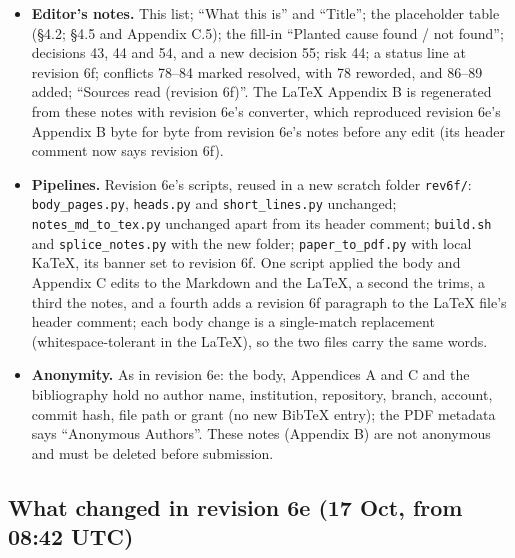 \documentclass{article}
\theoremstyle{plain}
\theoremstyle{definition}
\theoremstyle{remark}
\begin{document}
\begin{itemize}
        References); the heading sits about three lines lower on page 8 than in
        revision 6e.
  \item \textbf{Editor's notes.} This list; ``What this is'' and ``Title''; the
        placeholder table (\S{}4.2; \S{}4.5 and Appendix C.5); the fill-in
        ``Planted cause found / not found''; decisions 43, 44 and 54, and a new
        decision 55; risk 44; a status line at revision 6f; conflicts 78--84
        marked resolved, with 78 reworded, and 86--89 added; ``Sources read
        (revision 6f)''. The LaTeX Appendix B is regenerated from these notes
        with revision 6e's converter, which reproduced revision 6e's Appendix B
        byte for byte from revision 6e's notes before any edit (its header
        comment now says revision 6f).
  \item \textbf{Pipelines.} Revision 6e's scripts, reused in a new scratch
        folder \nolinkurl{rev6f/}: \nolinkurl{body_pages.py},
        \nolinkurl{heads.py} and \nolinkurl{short_lines.py} unchanged;
        \nolinkurl{notes_md_to_tex.py} unchanged apart from its header comment;
        \nolinkurl{build.sh} and \nolinkurl{splice_notes.py} with the new
        folder; \nolinkurl{paper_to_pdf.py} with local KaTeX, its banner set to
        revision 6f. One script applied the body and Appendix C edits to the
        Markdown and the LaTeX, a second the trims, a third the notes, and a
        fourth adds a revision 6f paragraph to the LaTeX file's header comment;
        each body change is a single-match replacement (whitespace-tolerant in
        the LaTeX), so the two files carry the same words.
  \item \textbf{Anonymity.} As in revision 6e: the body, Appendices A and C and
        the bibliography hold no author name, institution, repository, branch,
        account, commit hash, file path or grant (no new BibTeX entry); the PDF
        metadata says ``Anonymous Authors''. These notes (Appendix B) are not
        anonymous and must be deleted before submission.
\end{itemize}

\subsection{What changed in revision 6e (17 Oct, from 08:42 UTC)}
\end{document}
